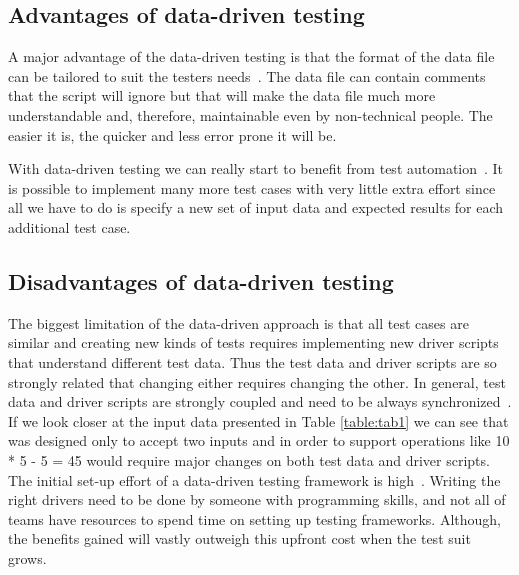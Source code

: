 \subsection{Advantages of data-driven testing}

A major advantage of the data-driven testing is that the format of the
data file can be tailored to suit the testers needs~\cite{Fewster99}. The data
file can contain comments that the script will ignore but that will make the
data file much more understandable and, therefore, maintainable even by
non-technical people. The easier it is, the quicker and less error prone it
will be.

With data-driven testing we can really start to benefit from test automation~\cite{Fewster99}.
It is possible to implement many more test cases with very little extra effort
since all we have to do is specify a new set of input data and expected results
for each additional test case.\\[1mm]



\subsection{Disadvantages of data-driven testing}

The biggest limitation of the data-driven approach is that all test cases are
similar and creating new kinds of tests requires implementing new driver scripts
that understand different test data. Thus the test data and driver scripts are
so strongly related that changing either requires changing the other. In general,
test data and driver scripts are strongly coupled and need to be always
synchronized~\cite{Fewster99}. If we look closer at the input data presented in
Table \ref{table:tab1} we can see that was designed only to accept two inputs
and in order to support operations like 10 * 5 - 5 = 45 would require major
changes on both test data and driver scripts.
The initial set-up effort of a data-driven testing framework is high~\cite{Fewster99}.
Writing the right drivers need to be done by someone with programming skills,
and not all of teams have resources to spend time on setting up testing
frameworks. Although, the benefits gained will vastly outweigh this upfront cost
when the test suit grows.

